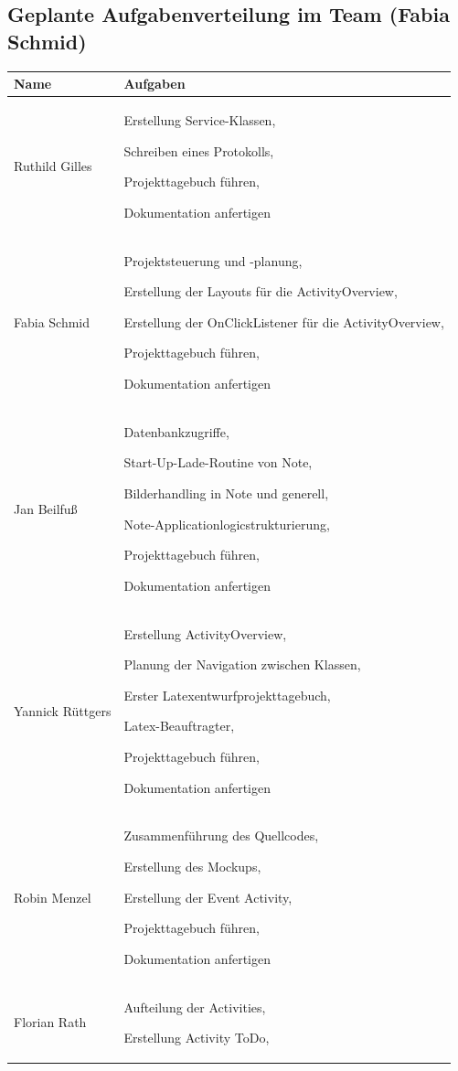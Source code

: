 \subsection{Geplante Aufgabenverteilung im Team (Fabia Schmid)}

\begin{longtable}{|p{4cm}|p{10cm}|}
\hline
{\textbf{Name}} & {\textbf{Aufgaben}}  \\ \hline
Ruthild Gilles & Erstellung Service-Klassen,

Schreiben eines Protokolls,

Projekttagebuch führen, 

Dokumentation anfertigen \\ \hline 
Fabia Schmid  & Projektsteuerung und -planung, 

Erstellung der Layouts für die ActivityOverview,  

Erstellung der OnClickListener für die ActivityOverview,  

Projekttagebuch führen, 

Dokumentation anfertigen \\ \hline

Jan Beilfuß & Datenbankzugriffe, 

Start-Up-Lade-Routine von Note, 

Bilderhandling in Note und generell, 

Note-Applicationlogicstrukturierung, 

Projekttagebuch führen, 

Dokumentation anfertigen \\ \hline
Yannick Rüttgers & Erstellung ActivityOverview,  

Planung der Navigation zwischen Klassen, 

Erster Latexentwurfprojekttagebuch, 

Latex-Beauftragter, 

Projekttagebuch führen, 

Dokumentation anfertigen \\ \hline
Robin Menzel & Zusammenführung des Quellcodes, 

Erstellung des Mockups, 

Erstellung der Event Activity, 

Projekttagebuch führen, 

Dokumentation anfertigen \\ \hline
Florian Rath  & Aufteilung der Activities, 

Erstellung Activity ToDo, 


\end{longtable}
